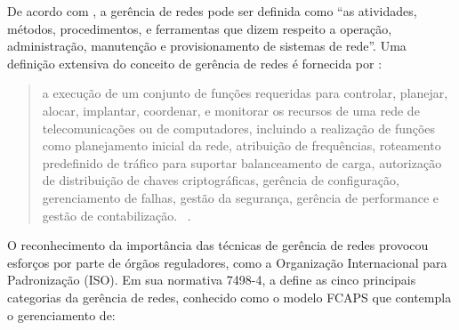 \documentclass[twoside,english,brazilian]{UNISINOSmonografia}
\begin{document}
	De acordo com , a gerência de redes pode ser definida 
	como ``as atividades, métodos, procedimentos, e ferramentas que dizem 
	respeito a operação, administração, manutenção e provisionamento de 
	sistemas de rede''. Uma definição extensiva do conceito de gerência de 
	redes é fornecida por :
	
	\begin{quote}
		a execução de um conjunto de funções requeridas para controlar, 
		planejar, alocar, implantar, coordenar, e monitorar os recursos de uma 
		rede de telecomunicações ou de computadores, incluindo a realização de 
		funções como planejamento inicial da rede, atribuição de frequências, 
		roteamento predefinido de tráfico para suportar balanceamento de 
		carga, autorização de distribuição de chaves criptográficas, gerência 
		de configuração, gerenciamento de falhas, gestão da segurança, 
		gerência de performance e gestão de contabilização.~
		\cite[p.~64]{Ding2009}.
	\end{quote}
	
	O reconhecimento da importância das técnicas de gerência de redes provocou 
	esforços por parte de órgãos reguladores, como a Organização Internacional 
	para Padronização (ISO). Em sua normativa 7498-4, a  
	define as cinco principais categorias da gerência de redes, conhecido como 
	o modelo FCAPS que contempla o gerenciamento de:
	
\end{document}
